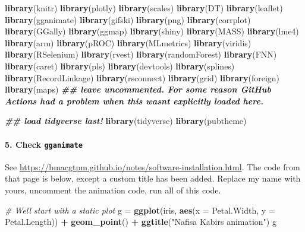 \documentclass[
]{article}
\newenvironment{Shaded}{\begin{snugshade}}{\end{snugshade}}
\newcommand{\AttributeTok}[1]{\textcolor[rgb]{0.13,0.29,0.53}{#1}}
\newcommand{\CommentTok}[1]{\textcolor[rgb]{0.56,0.35,0.01}{\textit{#1}}}
\newcommand{\DocumentationTok}[1]{\textcolor[rgb]{0.56,0.35,0.01}{\textbf{\textit{#1}}}}
\newcommand{\FunctionTok}[1]{\textcolor[rgb]{0.13,0.29,0.53}{\textbf{#1}}}
\newcommand{\NormalTok}[1]{#1}
\newcommand{\OtherTok}[1]{\textcolor[rgb]{0.56,0.35,0.01}{#1}}
\newcommand{\SpecialCharTok}[1]{\textcolor[rgb]{0.81,0.36,0.00}{\textbf{#1}}}
\newcommand{\StringTok}[1]{\textcolor[rgb]{0.31,0.60,0.02}{#1}}
\begin{document}
\begin{Shaded}
\begin{Highlighting}[]
\FunctionTok{library}\NormalTok{(knitr)}
\FunctionTok{library}\NormalTok{(plotly)}
\FunctionTok{library}\NormalTok{(scales)}
\FunctionTok{library}\NormalTok{(DT)}
\FunctionTok{library}\NormalTok{(leaflet)}
\FunctionTok{library}\NormalTok{(gganimate)}
\FunctionTok{library}\NormalTok{(gifski)}
\FunctionTok{library}\NormalTok{(png)}
\FunctionTok{library}\NormalTok{(corrplot)}
\FunctionTok{library}\NormalTok{(GGally)}
\FunctionTok{library}\NormalTok{(ggmap)}
\FunctionTok{library}\NormalTok{(shiny)}
\FunctionTok{library}\NormalTok{(MASS)}
\FunctionTok{library}\NormalTok{(lme4)}
\FunctionTok{library}\NormalTok{(arm)}
\FunctionTok{library}\NormalTok{(pROC)}
\FunctionTok{library}\NormalTok{(MLmetrics)}
\FunctionTok{library}\NormalTok{(viridis)}
\FunctionTok{library}\NormalTok{(RSelenium)}
\FunctionTok{library}\NormalTok{(rvest)}
\FunctionTok{library}\NormalTok{(randomForest)}
\FunctionTok{library}\NormalTok{(FNN)}
\FunctionTok{library}\NormalTok{(caret)}
\FunctionTok{library}\NormalTok{(pls)}
\FunctionTok{library}\NormalTok{(devtools)}
\FunctionTok{library}\NormalTok{(splines)}
\FunctionTok{library}\NormalTok{(RecordLinkage)}
\FunctionTok{library}\NormalTok{(rsconnect)}
\FunctionTok{library}\NormalTok{(grid)}
\FunctionTok{library}\NormalTok{(foreign)}
\FunctionTok{library}\NormalTok{(maps) }\DocumentationTok{\#\# leave uncommented. For some reason GitHub Actions had a problem when this wasn\textquotesingle{}t explicitly loaded here. }

\DocumentationTok{\#\# load tidyverse last!}
\FunctionTok{library}\NormalTok{(tidyverse)}
\FunctionTok{library}\NormalTok{(pubtheme)}
\end{Highlighting}
\end{Shaded}

\paragraph{\texorpdfstring{5. Check
\texttt{gganimate}}{5. Check gganimate}}\label{check-gganimate}

See \url{https://bmacgtpm.github.io/notes/software-installation.html}.
The code from that page is below, except a custom title has been added.
Replace my name with yours, uncomment the animation code, run all of
this code.

\begin{Shaded}
\begin{Highlighting}[]
\CommentTok{\# We\textquotesingle{}ll start with a static plot}
\NormalTok{g }\OtherTok{=} \FunctionTok{ggplot}\NormalTok{(iris, }
            \FunctionTok{aes}\NormalTok{(}\AttributeTok{x =}\NormalTok{ Petal.Width, }
                \AttributeTok{y =}\NormalTok{ Petal.Length)) }\SpecialCharTok{+} 
  \FunctionTok{geom\_point}\NormalTok{() }\SpecialCharTok{+} 
  \FunctionTok{ggtitle}\NormalTok{(}\StringTok{"Nafisa Kabir\textquotesingle{}s animation"}\NormalTok{)}
\NormalTok{g}
\end{Highlighting}
\end{Shaded}
\end{document}
